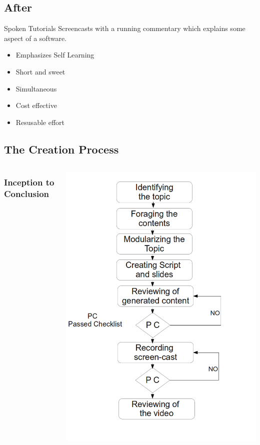 \documentclass[compress,red]{beamer} %
\begin{document}
\subsection{After}
\begin{frame}
\begin{block}{Spoken Tutorials}
Screencasts with a running commentary which explains some aspect of a software.
\end{block}
\begin{exampleblock}{}
\begin{itemize}
\item Emphasizes Self Learning
\item Short and sweet
\item Simultaneous
\item Cost effective
\item Resusable effort
\end{itemize}
\end{exampleblock}
\end{frame}

\subsection{The Creation Process}
\begin{frame}
\begin{columns}
\frametitle{Inception to Conclusion}
\includegraphics[scale=0.25]{st-fc.png}
\end{columns}
\end{frame}
\end{document}
